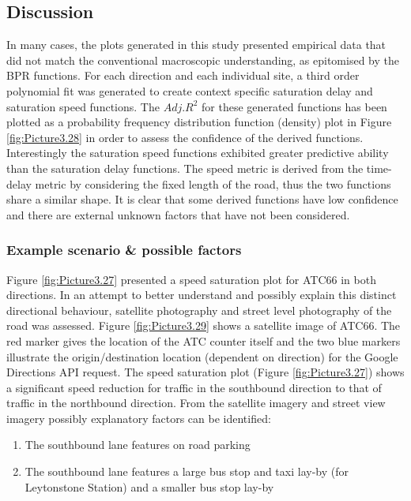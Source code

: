 \documentclass{CUP-JNL-DCE}
\begin{document}
\subsection{Discussion}

In many cases, the plots generated in this study presented empirical data that did not match the conventional macroscopic understanding, as epitomised by the BPR functions. For each direction and each individual site, a third order polynomial fit was generated to create context specific saturation delay and saturation speed functions. The $Adj. R^2$ for these generated functions has been plotted as a probability frequency distribution function (density) plot in Figure \ref{fig:Picture3.28} in order to assess the confidence of the derived functions. Interestingly the saturation speed functions exhibited greater predictive ability than the saturation delay functions. The speed metric is derived from the time-delay metric by considering the fixed length of the road, thus the two functions share a similar shape. It is clear that some derived functions have low confidence and there are external unknown factors that have not been considered. 

\subsubsection{Example scenario \& possible factors} \label{factors}

Figure \ref{fig:Picture3.27} presented a speed saturation plot for ATC66 in both directions. In an attempt to better understand and possibly explain this distinct directional behaviour, satellite photography and street level photography of the road was assessed. Figure \ref{fig:Picture3.29} shows a satellite image of ATC66. The red marker gives the location of the ATC counter itself and the two blue markers illustrate the origin/destination location (dependent on direction) for the Google Directions API request. The speed saturation plot (Figure \ref{fig:Picture3.27}) shows a significant speed reduction for traffic in the southbound direction to that of traffic in the northbound direction. From the satellite imagery and street view imagery \citep{Google_street_view} possibly explanatory factors can be identified:

\begin{enumerate}
	\item The southbound lane features on road parking
	\item The southbound lane features a large bus stop and taxi lay-by (for Leytonstone Station) and a smaller bus stop lay-by
\end{enumerate}
\end{document}
